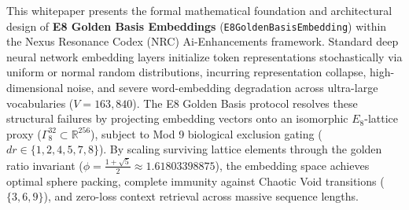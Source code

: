\begin{abstractbox}
This whitepaper presents the formal mathematical foundation and architectural design of \textbf{E8 Golden Basis Embeddings} (\texttt{E8GoldenBasisEmbedding}) within the Nexus Resonance Codex (NRC) Ai-Enhancements framework. Standard deep neural network embedding layers initialize token representations stochastically via uniform or normal random distributions, incurring representation collapse, high-dimensional noise, and severe word-embedding degradation across ultra-large vocabularies ($V = 163,840$). The E8 Golden Basis protocol resolves these structural failures by projecting embedding vectors onto an isomorphic $E_8$-lattice proxy ($\Gamma_8^{32} \subset \mathbb{R}^{256}$), subject to Mod 9 biological exclusion gating ($dr \in \{1, 2, 4, 5, 7, 8\}$). By scaling surviving lattice elements through the golden ratio invariant ($\phi = \frac{1+\sqrt{5}}{2} \approx 1.61803398875$), the embedding space achieves optimal sphere packing, complete immunity against Chaotic Void transitions ($\{3, 6, 9\}$), and zero-loss context retrieval across massive sequence lengths.
\end{abstractbox}
